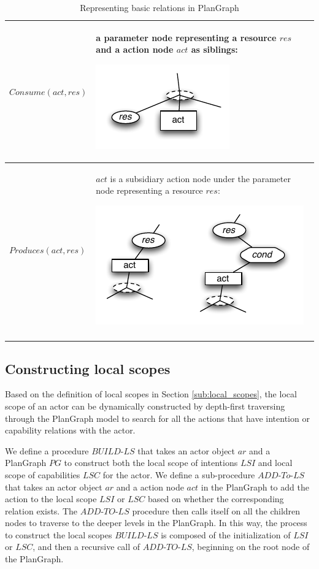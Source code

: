 {\begin{longtable}{>{\raggedright}p{1.5in}>{\raggedright}p{4in}}
\midrule 
$Consume(act, res)$ & a parameter node representing a resource $res$ and  a action node $act$ as siblings: 
\par \includegraphics{consumes.pdf}\tabularnewline
\midrule 
$Produces(act, res)$ &  $act$ is a subsidiary action node under the parameter node representing a resource $res$: 
\par \includegraphics{produces.pdf}\tabularnewline
\bottomrule
\caption{Representing basic relations in PlanGraph}
\label{tab:basic_rel_pg}
\end{longtable}
}

\subsection{Constructing local scopes} %
\label{sub:representing_local_scopes}
Based on the definition of local scopes in Section \ref{sub:local_scopes}, the local scope of an actor can be dynamically constructed by depth-first traversing through the PlanGraph model to search for all the actions that have intention or capability relations with the actor.

We define a procedure $BUILD\textrm{-}LS$ that takes an actor object $ar$ and a PlanGraph $PG$ to construct both the local scope of intentions $LSI$ and local scope of capabilities $LSC$ for the actor. We define a sub-procedure $ADD\textrm{-}To\textrm{-}LS$ that takes an actor object $ar$ and a action node $act$ in the PlanGraph to add the action to the local scope $LSI$ or $LSC$ based on whether the corresponding relation exists. The $ADD\textrm{-}TO\textrm{-}LS$ procedure then calls itself on all the children nodes to traverse to the deeper levels in the PlanGraph. In this way, the process to construct the local scopes $BUILD\textrm{-}LS$ is composed of the initialization of $LSI$ or $LSC$, and then a recursive call of $ADD\textrm{-}TO\textrm{-}LS$, beginning on the root node of the PlanGraph.

